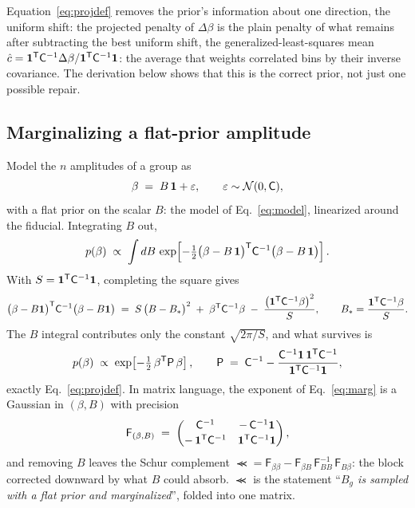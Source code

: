 Equation~\eqref{eq:projdef} removes the prior's information about one
direction, the uniform shift: the projected penalty of $\Delta\beta$
is the plain penalty of what remains after subtracting the best
uniform shift, the generalized-least-squares mean
$\hat{c} = \mathbf{1}^{\mathsf{T}} \mathsf{C}^{-1} \Delta\beta / \mathbf{1}^{\mathsf{T}} \mathsf{C}^{-1} \mathbf{1}$:
the average that weights correlated bins by their inverse covariance.
The derivation below shows that this is the correct prior, not just
one possible repair.

\subsection{Marginalizing a flat-prior amplitude}
\label{sec:viewc}

Model the $n$ amplitudes of a group as
\begin{equation}
  \beta \;=\; B\,\mathbf{1} + \varepsilon,
  \qquad
  \varepsilon \sim \mathcal{N}(0, \mathsf{C}),
  \label{eq:genmodel}
\end{equation}
with a flat prior on the scalar $B$: the model of Eq.~\eqref{eq:model},
linearized around the fiducial.  Integrating $B$ out,
\begin{equation}
  p(\beta) \;\propto\;
  \int dB\,
  \exp\!\left[
    -\tfrac{1}{2}
    \bigl(\beta - B\,\mathbf{1}\bigr)^{\mathsf{T}} \mathsf{C}^{-1} \bigl(\beta - B\,\mathbf{1}\bigr)
  \right].
  \label{eq:marg}
\end{equation}
With $S = \mathbf{1}^{\mathsf{T}} \mathsf{C}^{-1} \mathbf{1}$, completing the square gives
\begin{equation}
  \bigl(\beta - B\mathbf{1}\bigr)^{\mathsf{T}} \mathsf{C}^{-1} \bigl(\beta - B\mathbf{1}\bigr)
  \;=\;
  S\,\bigl(B - B_*\bigr)^2
  \;+\;
  \beta^{\mathsf{T}} \mathsf{C}^{-1} \beta
  \;-\;
  \frac{\bigl(\mathbf{1}^{\mathsf{T}} \mathsf{C}^{-1} \beta\bigr)^2}{S},
  \qquad
  B_* = \frac{\mathbf{1}^{\mathsf{T}} \mathsf{C}^{-1} \beta}{S} .
  \label{eq:complsq}
\end{equation}
The $B$ integral contributes only the constant $\sqrt{2\pi / S}$, and
what survives is
\begin{equation}
  p(\beta) \;\propto\;
  \exp\!\left[-\tfrac{1}{2}\, \beta^{\mathsf{T}} \mathsf{P}\, \beta\right],
  \qquad
  \mathsf{P} \;=\; \mathsf{C}^{-1}
  - \frac{\mathsf{C}^{-1}\mathbf{1}\,\mathbf{1}^{\mathsf{T}} \mathsf{C}^{-1}}{\mathbf{1}^{\mathsf{T}} \mathsf{C}^{-1} \mathbf{1}},
  \label{eq:margresult}
\end{equation}
exactly Eq.~\eqref{eq:projdef}.  In matrix language, the exponent of
Eq.~\eqref{eq:marg} is a Gaussian in $(\beta, B)$ with precision
\begin{equation}
  \mathsf{F}_{(\beta, B)}
  \;=\;
  \begin{pmatrix}
    \mathsf{C}^{-1} & -\,\mathsf{C}^{-1}\mathbf{1} \\[0.4ex]
    -\,\mathbf{1}^{\mathsf{T}} \mathsf{C}^{-1} & \mathbf{1}^{\mathsf{T}} \mathsf{C}^{-1} \mathbf{1}
  \end{pmatrix},
  \label{eq:jointprec}
\end{equation}
and removing $B$ leaves the Schur complement
$\Prec = \mathsf{F}_{\beta\beta}
- \mathsf{F}_{\beta B}\, \mathsf{F}_{BB}^{-1}\, \mathsf{F}_{B\beta}$: the
block corrected downward by what $B$ could absorb.  $\Prec$ is the
statement ``\emph{$B_g$ is sampled with a flat prior and
marginalized}'', folded into one matrix.

